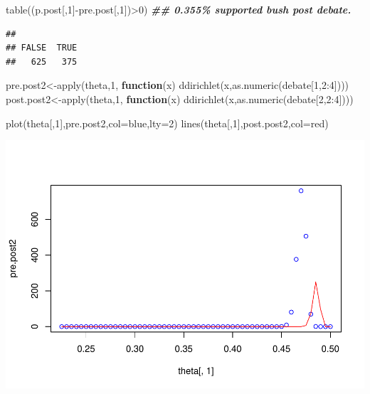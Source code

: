 \documentclass[
]{book}
\newenvironment{Shaded}{\begin{snugshade}}{\end{snugshade}}
\newcommand{\AttributeTok}[1]{\textcolor[rgb]{0.77,0.63,0.00}{#1}}
\newcommand{\ControlFlowTok}[1]{\textcolor[rgb]{0.13,0.29,0.53}{\textbf{#1}}}
\newcommand{\DecValTok}[1]{\textcolor[rgb]{0.00,0.00,0.81}{#1}}
\newcommand{\DocumentationTok}[1]{\textcolor[rgb]{0.56,0.35,0.01}{\textbf{\textit{#1}}}}
\newcommand{\FunctionTok}[1]{\textcolor[rgb]{0.00,0.00,0.00}{#1}}
\newcommand{\NormalTok}[1]{#1}
\newcommand{\OtherTok}[1]{\textcolor[rgb]{0.56,0.35,0.01}{#1}}
\newcommand{\SpecialCharTok}[1]{\textcolor[rgb]{0.00,0.00,0.00}{#1}}
\newcommand{\StringTok}[1]{\textcolor[rgb]{0.31,0.60,0.02}{#1}}
\theoremstyle{definition}
\theoremstyle{definition}
\theoremstyle{definition}
\theoremstyle{definition}
\theoremstyle{remark}
\begin{document}
\begin{Shaded}
\begin{Highlighting}[]
   \FunctionTok{table}\NormalTok{((p.post[,}\DecValTok{1}\NormalTok{]}\SpecialCharTok{{-}}\NormalTok{pre.post[,}\DecValTok{1}\NormalTok{])}\SpecialCharTok{\textgreater{}}\DecValTok{0}\NormalTok{) }\DocumentationTok{\#\# 0.355\% supported bush post debate.}
\end{Highlighting}
\end{Shaded}

\begin{verbatim}
## 
## FALSE  TRUE 
##   625   375
\end{verbatim}

\begin{Shaded}
\begin{Highlighting}[]
\NormalTok{ pre.post2}\OtherTok{\textless{}{-}}\FunctionTok{apply}\NormalTok{(theta,}\DecValTok{1}\NormalTok{, }\ControlFlowTok{function}\NormalTok{(x) }\FunctionTok{ddirichlet}\NormalTok{(x,}\FunctionTok{as.numeric}\NormalTok{(debate[}\DecValTok{1}\NormalTok{,}\DecValTok{2}\SpecialCharTok{:}\DecValTok{4}\NormalTok{])))}
\NormalTok{ post.post2}\OtherTok{\textless{}{-}}\FunctionTok{apply}\NormalTok{(theta,}\DecValTok{1}\NormalTok{, }\ControlFlowTok{function}\NormalTok{(x) }\FunctionTok{ddirichlet}\NormalTok{(x,}\FunctionTok{as.numeric}\NormalTok{(debate[}\DecValTok{2}\NormalTok{,}\DecValTok{2}\SpecialCharTok{:}\DecValTok{4}\NormalTok{])))}
 
  \FunctionTok{plot}\NormalTok{(theta[,}\DecValTok{1}\NormalTok{],pre.post2,}\AttributeTok{col=}\StringTok{\textquotesingle{}blue\textquotesingle{}}\NormalTok{,}\AttributeTok{lty=}\DecValTok{2}\NormalTok{)}
  \FunctionTok{lines}\NormalTok{(theta[,}\DecValTok{1}\NormalTok{],post.post2,}\AttributeTok{col=}\StringTok{\textquotesingle{}red\textquotesingle{}}\NormalTok{)}
\end{Highlighting}
\end{Shaded}

\includegraphics{_main_files/figure-latex/unnamed-chunk-30-2.pdf}
\end{document}
